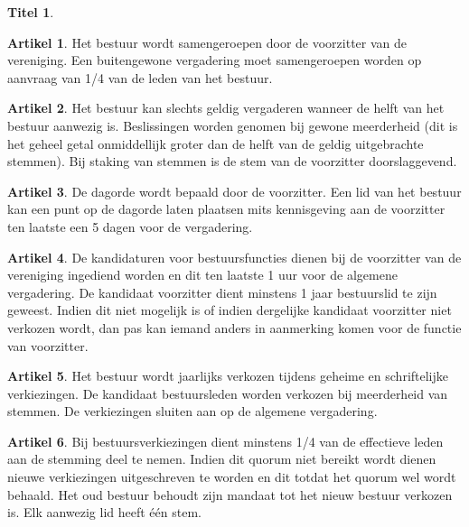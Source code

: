 \documentclass[a4paper,10pt]{article}
\theoremstyle{definition}
\newtheorem{titel}{\large Titel}
\newtheorem{artikel}{\large Artikel}
\newcommand{\hnl}{\hfill\newline}
\begin{document}
\begin{titel}
  \begin{artikel}\hnl
    Het bestuur wordt samengeroepen door de voorzitter van de vereniging.
    Een buitengewone vergadering moet samengeroepen worden op aanvraag van 1/4 van de leden van het bestuur.
  \end{artikel}

  \begin{artikel}\hnl
    Het bestuur kan slechts geldig vergaderen wanneer de helft van het bestuur aanwezig is.
    Beslissingen worden genomen bij gewone meerderheid (dit is het geheel getal onmiddellijk groter dan de helft van de geldig uitgebrachte stemmen).
    Bij staking van stemmen is de stem van de voorzitter doorslaggevend.
  \end{artikel}

  \begin{artikel}\hnl
    De dagorde wordt bepaald door de voorzitter.
    Een lid van het bestuur kan een punt op de dagorde laten plaatsen mits kennisgeving aan de voorzitter ten laatste een 5 dagen voor de vergadering.
  \end{artikel}

  \begin{artikel}\hnl
    De kandidaturen voor bestuursfuncties dienen bij de voorzitter van de vereniging ingediend worden en dit ten laatste 1 uur voor de algemene vergadering.
    De kandidaat voorzitter dient minstens 1 jaar bestuurslid te zijn geweest.
    Indien dit niet mogelijk is of indien dergelijke kandidaat voorzitter niet verkozen wordt, dan pas kan iemand anders in aanmerking komen voor de functie van voorzitter.
  \end{artikel}

  \begin{artikel}\hnl
    Het bestuur wordt jaarlijks verkozen tijdens geheime en schriftelijke verkiezingen.
    De kandidaat bestuursleden worden verkozen bij meerderheid van stemmen.
    De verkiezingen sluiten aan op de algemene vergadering.
  \end{artikel}

  \begin{artikel}\hnl
    Bij bestuursverkiezingen dient minstens 1/4 van de effectieve leden aan de stemming deel te nemen.
    Indien dit quorum niet bereikt wordt dienen nieuwe verkiezingen uitgeschreven te worden en dit totdat het quorum wel wordt behaald.
    Het oud bestuur behoudt zijn mandaat tot het nieuw bestuur verkozen is.
    Elk aanwezig lid heeft één stem.
  \end{artikel}

\end{titel}
\end{document}

